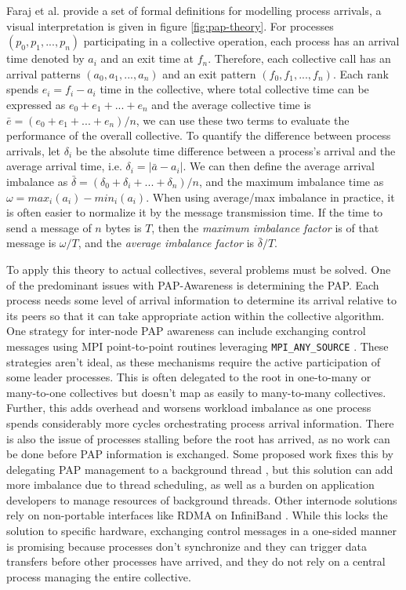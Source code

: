 Faraj et al. \cite{Faraj2008StudyProcArrivalMPIColl} provide a set of formal definitions for modelling process arrivals, a visual interpretation is given in figure \ref{fig:pap-theory}.
For processes $(p_0, p_1,...,p_n)$ participating in a collective operation, each process has an arrival time denoted by $a_i$ and an exit time at $f_n$.
Therefore, each collective call has an arrival patterns $(a_0, a_1, ..., a_n)$ and an exit pattern $(f_0, f_1, ..., f_n)$.
Each rank spends $e_i = f_i - a_i$ time in the collective, where total collective time can be expressed as $e_0 + e_1 + ... + e_n$ and the average collective time is $\bar{e} = (e_0 + e_1 + ... + e_n)/n$, we can use these two terms to evaluate the performance of the overall collective.
To quantify the difference between process arrivals, let $\delta_i$ be the absolute time difference between a process's arrival and the average arrival time, i.e. $\delta_i = |\bar{a} - a_i|$. 
We can then define the average arrival imbalance as $\bar{\delta}=(\delta_0 + \delta_i + ... + \delta_n)/n$, and the maximum imbalance time as $\omega = max_i(a_i)-min_i(a_i)$.
When using average/max imbalance in practice, it is often easier to normalize it by the message transmission time.
If the time to send a message of $n$ bytes is $T$, then the \textit{maximum imbalance factor} is of that message is $\omega/T$, and the \textit{average imbalance factor} is $\bar{\delta}/T$.

To apply this theory to actual collectives, several problems must be solved.
One of the predominant issues with PAP-Awareness is determining the PAP.
Each process needs some level of arrival information to determine its arrival relative to its peers so that it can take appropriate action within the collective algorithm. 
One strategy for inter-node PAP awareness can include exchanging control messages using MPI point-to-point routines leveraging \texttt{MPI\_ANY\_SOURCE} \cite{Patarasuk2008EffBcastDifProcArr}.
These strategies aren't ideal, as these mechanisms require the active participation of some leader processes.
This is often delegated to the root in one-to-many or many-to-one collectives but doesn't map as easily to many-to-many collectives.
Further, this adds overhead and worsens workload imbalance as one process spends considerably more cycles orchestrating process arrival information.
There is also the issue of processes stalling before the root has arrived, as no work can be done before PAP information is exchanged.
Some proposed work fixes this by delegating PAP management to a background thread \cite{Proficz2018ImprvAllReduceForImbPAP, Proficz2020PAPAwareScatterGather, Proficz2021AllGatherResilientToImbPAP, Faraj2008StudyProcArrivalMPIColl}, but this solution can add more imbalance due to thread scheduling, as well as a burden on application developers to manage resources of background threads.
Other internode solutions rely on non-portable interfaces like RDMA on InfiniBand \cite{Qian2009ProcArrivalSHMA2AIB}.
While this locks the solution to specific hardware, exchanging control messages in a one-sided manner is promising because processes don't synchronize and they can trigger data transfers before other processes have arrived, and they do not rely on a central process managing the entire collective. 

